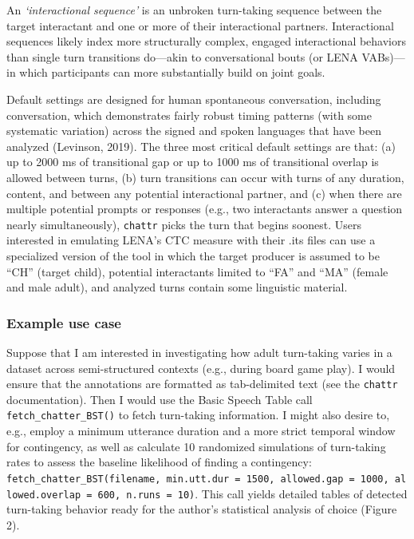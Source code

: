 \documentclass[10pt, letterpaper]{article}
\begin{document}
An \emph{`interactional sequence'} is an unbroken turn-taking sequence
between the target interactant and one or more of their interactional
partners. Interactional sequences likely index more structurally
complex, engaged interactional behaviors than single turn transitions
do---akin to conversational bouts (or LENA VABs)---in which participants
can more substantially build on joint goals.

Default settings are designed for human spontaneous conversation,
including conversation, which demonstrates fairly robust timing patterns
(with some systematic variation) across the signed and spoken languages
that have been analyzed (Levinson, 2019). The three most critical
default settings are that: (a) up to 2000 ms of transitional gap or up
to 1000 ms of transitional overlap is allowed between turns, (b) turn
transitions can occur with turns of any duration, content, and between
any potential interactional partner, and (c) when there are multiple
potential prompts or responses (e.g., two interactants answer a question
nearly simultaneously), \texttt{chattr} picks the turn that begins
soonest. Users interested in emulating LENA's CTC measure with their
.its files can use a specialized version of the tool in which the target
producer is assumed to be ``CH'' (target child), potential interactants
limited to ``FA'' and ``MA'' (female and male adult), and analyzed turns
contain some linguistic material.

\hypertarget{example-use-case}{%
\subsubsection{Example use case}\label{example-use-case}}

Suppose that I am interested in investigating how adult turn-taking
varies in a dataset across semi-structured contexts (e.g., during board
game play). I would ensure that the annotations are formatted as
tab-delimited text (see the \texttt{chattr} documentation). Then I would
use the Basic Speech Table call \texttt{fetch\_chatter\_BST()} to fetch
turn-taking information. I might also desire to, e.g., employ a minimum
utterance duration and a more strict temporal window for contingency, as
well as calculate 10 randomized simulations of turn-taking rates to
assess the baseline likelihood of finding a contingency:
\texttt{fetch\_chatter\_BST(filename,\ min.utt.dur\ =\ 1500,\ allowed.gap\ =\ 1000,\ allowed.overlap\ =\ 600,\ n.runs\ =\ 10)}.
This call yields detailed tables of detected turn-taking behavior ready
for the author's statistical analysis of choice (Figure 2).
\end{document}
